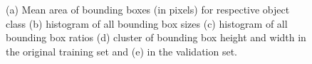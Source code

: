 \documentclass{article}
\begin{document}
\begin{figure}[t!]
    \centering
    \caption{(a) Mean area of bounding boxes (in pixels) for respective object class (b) histogram of all bounding box sizes (c) histogram of all bounding box ratios (d) cluster of bounding box height and width in the original training set and (e) in the validation set.}
    \label{fig:objects_expl}
\end{figure}
\end{document}
